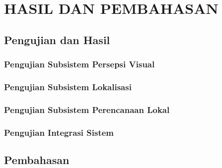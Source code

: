 \chapter{HASIL DAN PEMBAHASAN}
\label{chap:hasil_dan_pembahasan}

\section{Pengujian dan Hasil}
\label{sec:pengujian_dan_hasil}

\subsection{Pengujian Subsistem Persepsi Visual}
\label{sec:uji_persepsi_visual}


\subsection{Pengujian Subsistem Lokalisasi}
\label{sec:uji_lokalisasi}


\subsection{Pengujian Subsistem Perencanaan Lokal}
\label{sec:uji_perencanaan_lokal}


\subsection{Pengujian Integrasi Sistem}
\label{sec:uji_integrasi}


\section{Pembahasan}
\label{sec:pembahasan}


